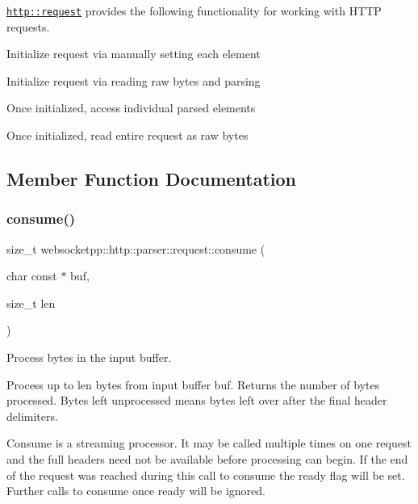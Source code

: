 \href{http::request}{\tt http\+::request} provides the following functionality for working with H\+T\+TP requests.


\begin{DoxyItemize}
\item Initialize request via manually setting each element
\item Initialize request via reading raw bytes and parsing
\item Once initialized, access individual parsed elements
\item Once initialized, read entire request as raw bytes 
\end{DoxyItemize}

\subsection{Member Function Documentation}
\mbox{\label{classwebsocketpp_1_1http_1_1parser_1_1request_abd9cae6f44634d62253d806d982ab1d6}} 
\subsubsection{\texorpdfstring{consume()}{consume()}}
{\footnotesize\ttfamily size\+\_\+t websocketpp\+::http\+::parser\+::request\+::consume (\begin{DoxyParamCaption}\item[{char const $\ast$}]{buf,  }\item[{size\+\_\+t}]{len }\end{DoxyParamCaption})\hspace{0.3cm}{\ttfamily [inline]}}



Process bytes in the input buffer. 

Process up to len bytes from input buffer buf. Returns the number of bytes processed. Bytes left unprocessed means bytes left over after the final header delimiters.

Consume is a streaming processor. It may be called multiple times on one request and the full headers need not be available before processing can begin. If the end of the request was reached during this call to consume the ready flag will be set. Further calls to consume once ready will be ignored.

